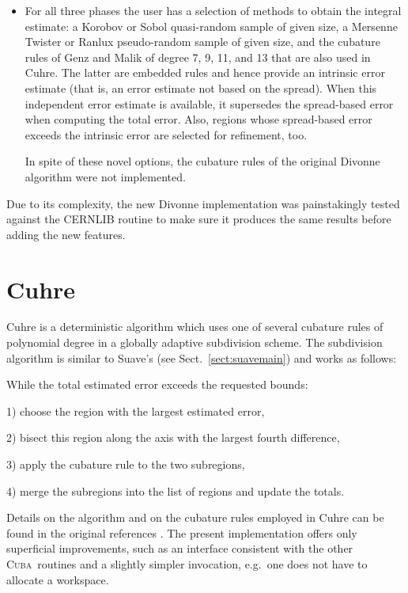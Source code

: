 \documentclass[12pt]{article}
\newcommand\cuba{\textsc{Cuba}}
\newcommand\eg{e.g.\ }
\begin{document}
\begin{itemize}
\item
For all three phases the user has a selection of methods to obtain the
integral estimate: a Korobov \cite{Korobov} or Sobol \cite{Sobol}
quasi-random sample of given size, a Mersenne Twister
\cite{MersenneTwister} or Ranlux \cite{Ranlux} pseudo-random sample of
given size, and the cubature rules of Genz and Malik \cite{GenzMalik}
of degree 7, 9, 11, and 13 that are also used in Cuhre.  The latter are
embedded rules and hence provide an intrinsic error estimate (that is,
an error estimate not based on the spread).  When this independent
error estimate is available, it supersedes the spread-based error when
computing the total error.  Also, regions whose spread-based error
exceeds the intrinsic error are selected for refinement, too.

In spite of these novel options, the cubature rules of the original 
Divonne algorithm were not implemented.
\end{itemize}

Due to its complexity, the new Divonne implementation was painstakingly
tested against the CERNLIB routine to make sure it produces the same
results before adding the new features.


\section{Cuhre}

Cuhre is a deterministic algorithm which uses one of several cubature
rules of polynomial degree in a globally adaptive subdivision scheme.
The subdivision algorithm is similar to Suave's (see Sect.\
\ref{sect:suavemain}) and works as follows:

While the total estimated error exceeds the requested bounds:

1) choose the region with the largest estimated error,

2) bisect this region along the axis with the largest fourth 
   difference,

3) apply the cubature rule to the two subregions,

4) merge the subregions into the list of regions and update the 
   totals.

Details on the algorithm and on the cubature rules employed in Cuhre can
be found in the original references \cite{dcuhre}.  The present
implementation offers only superficial improvements, such as an
interface consistent with the other \cuba\ routines and a slightly
simpler invocation, \eg one does not have to allocate a workspace.
\end{document}
